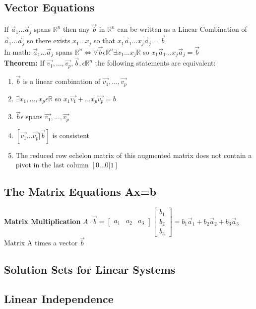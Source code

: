 \documentclass{article}
\begin{document}
\subsection{Vector Equations}
If ${\vec{a}_1...\vec{a}_j}$ spans $\mathbb{R}^n$ then any $\vec{b}$ in $\mathbb{R}^n$ can be written as a Linear Combination of ${\vec{a}_1...\vec{a}_j}$ so there exists ${{x}_1...{x}_j}$ so that ${x_1\vec{a}_1...x_j\vec{a}_j}=\vec{b}$ 
\\In math: ${\vec{a}_1...\vec{a}_j}$ spans $\mathbb{R}^n \Leftrightarrow \forall \vec{b} \epsilon \mathbb{R}^n \exists {{x}_1...{x}_j} \mathbb{R}$ so ${x_1\vec{a}_1...x_j\vec{a}_j}=\vec{b}$  
\\ \textbf{Theorem: }
If $\vec{v_1},..., \vec{v_p}, \vec{b}, \epsilon \mathbb{R}^n$ the following statements are equivalent:
\begin{enumerate}
    \item $\vec{b}$ is a linear combination of $\vec{v_1},...,\vec{v_p}$
    \item $\exists x_1,...,x_p \epsilon \mathbb{R}$ so $x_1\vec{v_1}+...x_p\vec{v_p}=b$
    \item $\vec{b} \epsilon$ spans {$\vec{v_1},..., \vec{v_p}$}
    \item {} $\left[\vec{v_1}...\vec{v_p} | \vec{b}\right]$ is consistent
    \item The reduced row echelon matrix of this augmented matrix does not contain a pivot in the last column $\left[0...0| 1 \right]$
\end{enumerate}
\subsection{The Matrix Equations Ax=b}
\textbf{Matrix Multiplication} $A\cdot \vec{b}= \left[\begin{array}{ccc}
    a_1&a_2&a_3
\end{array}\right]
\left[\begin{array}{c}
    b_1\\b_2\\b_3
\end{array}\right] = b_1\vec{a}_1 + b_2\vec{a}_2 + b_3\vec{a}_3$   \\Matrix A times a vector $\vec{b}$ 
\subsection{Solution Sets for Linear Systems}
\subsection{Linear Independence}
\end{document}
